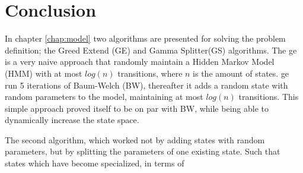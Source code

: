 \chapter{Conclusion}

In chapter \ref{chap:model} two algorithms are presented for solving the problem definition; the Greed Extend (GE) and Gamma Splitter(GS) algorithms. The \gls{ge} is a very naive approach that randomly maintain a Hidden Markov Model (HMM) with at most $log(n)$ transitions, where $n$ is the amount of states. \gls{ge} run 5 iterations of Baum-Welch (BW), thereafter it adds a random state with random parameters to the model, maintaining at most $log(n)$ transitions. This simple approach proved itself to be on par with BW, while being able to dynamically increase the state space.

The second algorithm, which worked not by adding states with random parameters, but by splitting the parameters of one existing state. Such that states which have become specialized, in terms of 